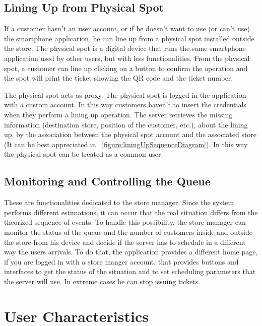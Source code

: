 \subsection{Lining Up from Physical Spot}
If a customer hasn't an user account, or if he doesn't want to use (or can't use) the smartphone application, he can line up from a physical spot installed outside the store.
The physical spot is a digital device that runs the same smartphone application used by other users, but with less functionalities.
From the physical spot, a customer can line up clicking on a button to confirm the operation and the spot will print the ticket showing the QR code and the ticket number.

The physical spot acts as proxy. The physical spot is logged in the application with a custom account. In this way customers haven't to insert the credentials when they perform a lining up operation.
The server retrieves the missing information (destination store, position of the customer, etc.), about the lining up, by the association between the physical spot account and the associated store (It can be best appreciated in ~\ref{figure:liningUpSequenceDiagram}).
In this way the physical spot can be treated as a common user.

\subsection{Monitoring and Controlling the Queue}
These are functionalities dedicated to the store manager. Since the system performs different estimations, it can occur that the real situation differs from the theorized sequence of events.
To handle this possibility, the store manager can monitor the status of the queue and the number of customers inside and outside the store from his device and decide if the server has to schedule in a different way the users arrivals.
To do that, the application provides a different home page, if you are logged in with a store manger account, that provides buttons and interfaces to get the status of the situation and to set scheduling parameters that the server will use. In extreme cases he can stop issuing tickets.



\section{User Characteristics}

